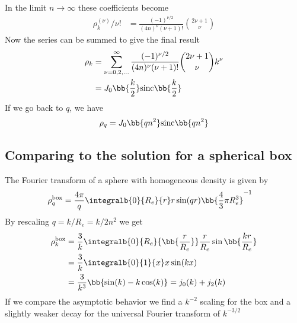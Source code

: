 In the limit $n\rightarrow \infty$ these coefficients become
\begin{align}
\rho^{(\nu)}_k/\nu! &= \frac{(-1)^{\nu/2}}{(4n)^\nu (\nu+1)!} \binom{2\nu+1}{\nu}
\end{align}
Now the series can be summed to give the final result
\begin{align}
\rho_k &= \sum_{\nu=0,2,\dots}^\infty \frac{(-1)^{\nu/2}}{(4n)^\nu (\nu+1)!} \binom{2\nu+1}{\nu} k^\nu \\
&= J_0\bb{\frac{k}{2}}\text{sinc}\bb{\frac{k}{2}}
\end{align}
If we go back to $q$, we have
\begin{align}
\rho_q = J_0\bb{q n^2}\text{sinc}\bb{q n^2}
\end{align}



\subsection{Comparing to the solution for a spherical box}
The Fourier transform of a sphere with homogeneous density is given by
\begin{align}
\rho^{\text{box}}_q &= \frac{4\pi}{q}\integralb{0}{R_e}{r} r \sin(qr) \bb{\frac{4}{3} \pi R_e^3}^{-1}
\end{align}
By rescaling $q= k/R_e= k/2n^2$ we get
\begin{align}
\rho^{\text{box}}_k &= \frac{3}{k}\integralb{0}{R_e}{\bb{\frac{r}{R_e}}} \frac{r}{R_e} \sin\bb{\frac{kr}{R_e}}\\
&= \frac{3}{k} \integralb{0}{1}{x} x \sin(kx) \\
&=\frac{3}{k^3}\bb{\sin(k)-k\cos(k)}=j_0(k) + j_2(k)
\end{align}
If we compare the asymptotic behavior we find a $k^{-2}$ scaling for the box and a slightly weaker decay for the universal Fourier transform of $k^{-3/2}$

